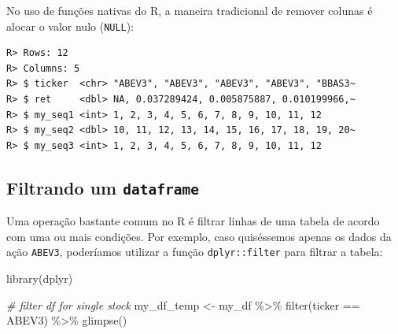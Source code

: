 \documentclass[
  11pt,
]{book}
\newenvironment{Shaded}{\begin{snugshade}}{\end{snugshade}}
\newcommand{\CommentTok}[1]{\textcolor[rgb]{0.37,0.37,0.37}{\textit{#1}}}
\newcommand{\ConstantTok}[1]{\textcolor[rgb]{0,0,0}{#1}}
\newcommand{\FunctionTok}[1]{\textcolor[rgb]{0,0,0}{#1}}
\newcommand{\NormalTok}[1]{#1}
\newcommand{\OtherTok}[1]{\textcolor[rgb]{0.37,0.37,0.37}{#1}}
\newcommand{\SpecialCharTok}[1]{\textcolor[rgb]{0,0,0}{#1}}
\newcommand{\StringTok}[1]{\textcolor[rgb]{0.5,0.5,0.5}{#1}}
\begin{document}
No uso de funções nativas do R, a maneira tradicional de remover colunas é alocar o valor nulo (\texttt{NULL}):

\begin{Shaded}
\end{Shaded}

\begin{verbatim}
R> Rows: 12
R> Columns: 5
R> $ ticker  <chr> "ABEV3", "ABEV3", "ABEV3", "ABEV3", "BBAS3~
R> $ ret     <dbl> NA, 0.037289424, 0.005875887, 0.010199966,~
R> $ my_seq1 <int> 1, 2, 3, 4, 5, 6, 7, 8, 9, 10, 11, 12
R> $ my_seq2 <dbl> 10, 11, 12, 13, 14, 15, 16, 17, 18, 19, 20~
R> $ my_seq3 <int> 1, 2, 3, 4, 5, 6, 7, 8, 9, 10, 11, 12
\end{verbatim}

\hypertarget{filtrando-um-dataframe}{%
\subsection{\texorpdfstring{Filtrando um \texttt{dataframe}}{Filtrando um dataframe}}\label{filtrando-um-dataframe}}

Uma operação bastante comum no R é filtrar linhas de uma tabela de acordo com uma ou mais condições. Por exemplo, caso quiséssemos apenas os dados da ação \texttt{ABEV3}, poderíamos utilizar a função \texttt{dplyr::filter} para filtrar a tabela: 

\begin{Shaded}
\begin{Highlighting}[]
\FunctionTok{library}\NormalTok{(dplyr)}

\CommentTok{\# filter df for single stock}
\NormalTok{my\_df\_temp }\OtherTok{\textless{}{-}}\NormalTok{ my\_df }\SpecialCharTok{\%\textgreater{}\%}
  \FunctionTok{filter}\NormalTok{(ticker }\SpecialCharTok{==} \StringTok{\textquotesingle{}ABEV3\textquotesingle{}}\NormalTok{) }\SpecialCharTok{\%\textgreater{}\%}
  \FunctionTok{glimpse}\NormalTok{()}
\end{Highlighting}
\end{Shaded}
\end{document}
